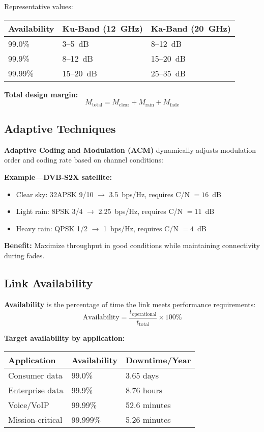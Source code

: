 Representative values:
\begin{center}
\begin{tabular}{@{}lll@{}}
\toprule
Availability & Ku-Band (12~GHz) & Ka-Band (20~GHz) \\
\midrule
99.0\% & 3--5~dB & 8--12~dB \\
99.9\% & 8--12~dB & 15--20~dB \\
99.99\% & 15--20~dB & 25--35~dB \\
\bottomrule
\end{tabular}
\end{center}

\textbf{Total design margin:}
\begin{equation}
\label{eq:total_margin}
M_{\text{total}} = M_{\text{clear}} + M_{\text{rain}} + M_{\text{fade}}
\end{equation}

\subsection{Adaptive Techniques}

\textbf{Adaptive Coding and Modulation (ACM)} dynamically adjusts modulation order and coding rate based on channel conditions:

\textbf{Example---DVB-S2X satellite:}
\begin{itemize}
\item Clear sky: 32APSK 9/10 $\rightarrow$ 3.5~bps/Hz, requires C/N $= 16$~dB
\item Light rain: 8PSK 3/4 $\rightarrow$ 2.25~bps/Hz, requires C/N $= 11$~dB
\item Heavy rain: QPSK 1/2 $\rightarrow$ 1~bps/Hz, requires C/N $= 4$~dB
\end{itemize}

\textbf{Benefit:} Maximize throughput in good conditions while maintaining connectivity during fades.

\subsection{Link Availability}

\textbf{Availability} is the percentage of time the link meets performance requirements:
\begin{equation}
\label{eq:availability}
\text{Availability} = \frac{t_{\text{operational}}}{t_{\text{total}}} \times 100\%
\end{equation}

\textbf{Target availability by application:}
\begin{center}
\begin{tabular}{@{}lll@{}}
\toprule
Application & Availability & Downtime/Year \\
\midrule
Consumer data & 99.0\% & 3.65 days \\
Enterprise data & 99.9\% & 8.76 hours \\
Voice/VoIP & 99.99\% & 52.6 minutes \\
Mission-critical & 99.999\% & 5.26 minutes \\
\bottomrule
\end{tabular}
\end{center}

